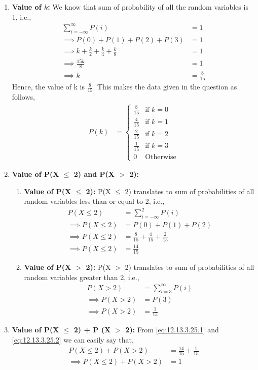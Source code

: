\documentclass[journal,12pt,twocolumn]{IEEEtran}
\theoremstyle{remark}
\begin{document}
\begin{enumerate}
\item \textbf{Value of $k$:} We know that sum of probability of all the random variables is 1, i.e.,
\begin{align}
	\sum_{i = -\infty}^{\infty}P(i) &= 1\\
	\implies P(0)+P(1)+P(2)+P(3) &= 1\\
	\implies k +\frac{k}{2} + \frac{k}{4} + \frac{k}{8} &= 1\\
	\implies \frac{15k}{8} &= 1\\
	\implies k &= \frac{8}{15}
\end{align}
Hence, the value of k is $\frac{8}{15}$.
This makes the data given in the question as follows,
\begin{align}
P(k) &= 
		\begin{cases}
			\frac{8}{15} & \text{if } k = 0 \\
			\frac{4}{15} & \text{if } k = 1 \\
			\frac{2}{15} & \text{if } k = 2 \\
			\frac{1}{15} & \text{if } k = 3 \\
			0 & \text{Otherwise}
		\end{cases}
\end{align}
\item \textbf{Value of P(X $\le$ 2) and P(X $>$ 2):}
	\begin{enumerate}
	\item \textbf{Value of P(X $\le$ 2):} P(X $\le$ 2) translates to sum of probabilities of all random variables less than or equal to 2, i.e.,
	\begin{align}
	P(X \le 2) &= \sum_{i = -\infty}^{2}P(i)\\
	\implies P(X \le 2) &= P(0)+P(1)+P(2) \\
	\implies P(X \le 2) &= \frac{8}{15}+\frac{4}{15}+\frac{2}{15}\\
	\implies P(X \le 2) &= \frac{14}{15} \label{eq:12.13.3.25.1}
	\end{align}
	\item \textbf{Value of P(X $>$ 2):} P(X $>$ 2) translates to sum of probabilities of all random variables greater than 2, i.e.,
	\begin{align}
	P(X > 2) &= \sum_{i=3}^{\infty}P(i)\\
	\implies P(X > 2) &= P(3) \\
	\implies P(X > 2) &= \frac{1}{15} \label{eq:12.13.3.25.2}
	\end{align}
	\end{enumerate}
\item \textbf{Value of P(X $\le$ 2) + P (X $>$ 2):} From \eqref{eq:12.13.3.25.1} and \eqref{eq:12.13.3.25.2} we can easily say that,
\begin{align}
	P(X \le 2) + P (X > 2) &= \frac{14}{15} + \frac{1}{15}\\
	\implies P(X \le 2) + P (X > 2) &= 1
\end{align}
\end{enumerate}
\end{document}
